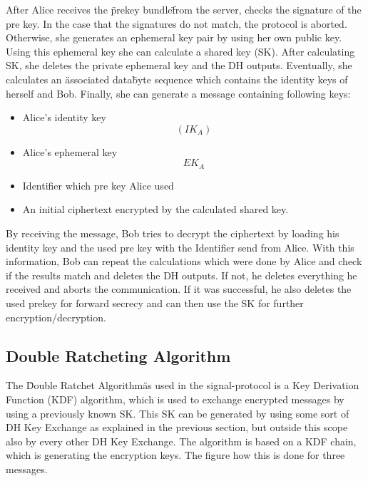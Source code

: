 \documentclass[12pt,oneside,a4paper,parskip]{scrbook}
\begin{document}
After Alice receives the \"prekey bundle\" from the server, checks the signature of the pre key. In the case that the signatures do not match, the protocol is aborted.
Otherwise, she generates an ephemeral key pair by using her own public key. Using this ephemeral key she can calculate a shared key (SK). After calculating SK, she deletes the private ephemeral key and the DH outputs. Eventually, she calculates an \"associated data\" byte sequence which contains the identity keys of herself and Bob.
Finally, she can generate a message containing following keys:
\begin{itemize}
  \item Alice's identity key  \[  (IK_{A}) \]
  \item Alice's ephemeral key \[  {EK_{A}} \] 
  \item Identifier which pre key Alice used
  \item An initial ciphertext encrypted by the calculated shared key.
\end{itemize}

By receiving the message, Bob tries to decrypt the ciphertext by loading his identity key and the used pre key with the Identifier send from Alice. With this information, Bob can repeat the calculations which were done by Alice and check if the results match and deletes the DH outputs. If not, he deletes everything he received and aborts the communication. If it was successful, he also deletes the used prekey for forward secrecy and can then use the SK for further encryption/decryption. 

\subsection{Double Ratcheting Algorithm}

The \"Double Ratchet Algorithm\" as used in the signal-protocol is a Key Derivation Function (KDF) algorithm, which is used to exchange encrypted messages by using a previously known SK. This SK can be generated by using some sort of DH Key Exchange as explained in the previous section, but outside this scope also by every other DH Key Exchange. 
The algorithm is based on a KDF chain, which is generating the encryption keys. The figure how this is done for three messages.
\end{document}
